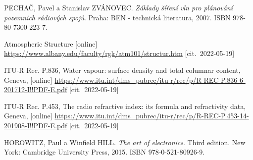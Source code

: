 \documentclass[twoside]{ctuthesis}
\theoremstyle{plain}
\theoremstyle{definition}
\theoremstyle{note}
\begin{document}
	
















	


\appendix

\printindex

\appendix
\begin{thebibliography}{1}
	PECHAČ, Pavel a Stanislav ZVÁNOVEC. \textit{Základy šíření vln pro plánování pozemních rádiových spojů}. Praha: BEN - technická literatura, 2007. ISBN 978-80-7300-223-7.

	Atmospheric Structure [online] \url{https://www.albany.edu/faculty/rgk/atm101/structur.htm} [cit.~2022-05-19]

	ITU-R Rec. P.836, Water vapour: surface density and total columnar content, Geneva, [online] \url{https://www.itu.int/dms_pubrec/itu-r/rec/p/R-REC-P.836-6-201712-I!!PDF-E.pdf} [cit.~2022-05-19]

	ITU-R Rec. P.453, The radio refractive index: its formula and refractivity data, Geneva, [online] \url{https://www.itu.int/dms_pubrec/itu-r/rec/p/R-REC-P.453-14-201908-I!!PDF-E.pdf} [cit.~2022-05-19]

	HOROWITZ, Paul a Winfield HILL. \textit{The art of electronics}. Third edition. New York: Cambridge University Press, 2015. ISBN 978-0-521-80926-9.


\end{thebibliography}
%
%

\end{document}
